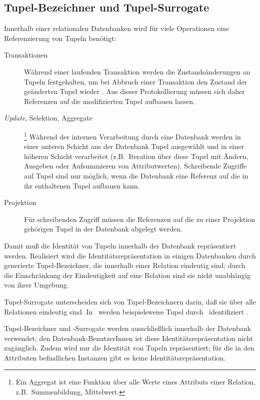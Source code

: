 \subsection{Tupel-Bezeichner und Tupel-Surrogate}
%
Innerhalb einer relationalen Datenbanken wird f\"{u}r viele Operationen
eine Referenzierung von Tupeln ben\"{o}tigt:
%
\begin{description}
%
\item[Transaktionen] W\"{a}hrend einer laufenden Transaktion werden die
Zustands\"{a}nderungen an Tupeln festgehalten, um bei Abbruch einer
Transaktion den Zustand der ge\"{a}nderten Tupel wieder . Aus
dieser Protokollierung m\"{u}ssen sich daher Referenzen auf die
modifizierten Tupel aufbauen lassen.
%
\item[{\em Update}, Selektion,
Aggregate]\hspace*{-\labelsep}\footnote{Ein Aggregat ist eine Funktion
\"{u}ber alle Werte eines Attributs einer Relation, z.B.\ Summenbildung,
Mittelwert.}\hspace*{\labelsep} W\"{a}hrend der internen Verarbeitung
durch eine Datenbank werden in einer unteren Schicht aus der Datenbank
Tupel ausgew\"{a}hlt und in einer h\"{o}heren Schicht verarbeitet
(z.B.\ Iteration \"{u}ber diese Tupel mit \"{A}ndern, Ausgeben oder
Aufsummieren von Attributwerten).  Schreibende Zugriffe auf Tupel sind nur
m\"{o}glich, wenn die Datenbank eine Referenz auf die in ihr enthaltenen
Tupel aufbauen kann.
%
\item[Projektion] F\"{u}r schreibenden Zugriff m\"{u}ssen die Referenzen auf
die zu einer Projektion ge\-h\"{o}\-ri\-gen Tupel in der Datenbank
abgelegt werden.
%
\end{description}
%
Damit mu\ss{} die Identit\"{a}t von Tupeln innerhalb der Datenbank
repr\"{a}sentiert werden. Realisiert wird die Identit\"{a}tsrepr\"{a}sentation
in einigen Datenbanken durch generierte Tupel-Bezeichner, die
innerhalb einer Relation eindeutig sind; durch die Einschr\"{a}nkung der
Eindeutigkeit auf eine Relation sind sie nicht unabh\"{a}ngig von ihrer
Umgebung.
%
\par{}Tupel-Surrogate unterscheiden sich von Tupel-Bezeichnern darin,
da\ss{} sie \"{u}ber alle Relationen eindeutig sind. In \postgres\ werden
beispielsweise Tupel durch \ identifiziert \cite[]{bib:sto86a}.
%
\par{}Tupel-Bezeichner und -Surrogate werden ausschlie\ss{}lich
innerhalb der Datenbank verwendet; den Datenbank-BenutzerInnen ist
diese Identit\"{a}tsrepr\"{a}sentation nicht zug\"{a}nglich. Zudem wird nur die
Identit\"{a}t von Tupeln repr\"{a}sentiert; f\"{u}r die in den Attributen
befindlichen Instanzen gibt es keine Identit\"{a}tsrepr\"{a}sentation.
%
